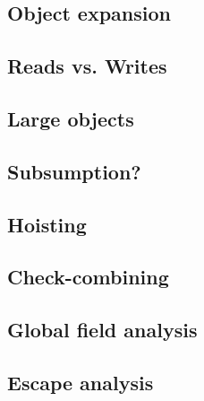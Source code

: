 \documentclass[preprint]{rdbacmconf}
\begin{document}
\subsection{Object expansion}
\subsection{Reads vs. Writes}
\subsection{Large objects}
\subsection{Subsumption?}


\subsection{Hoisting}
\subsection{Check-combining}
\subsection{Global field analysis}
\subsection{Escape analysis}


\end{document}
